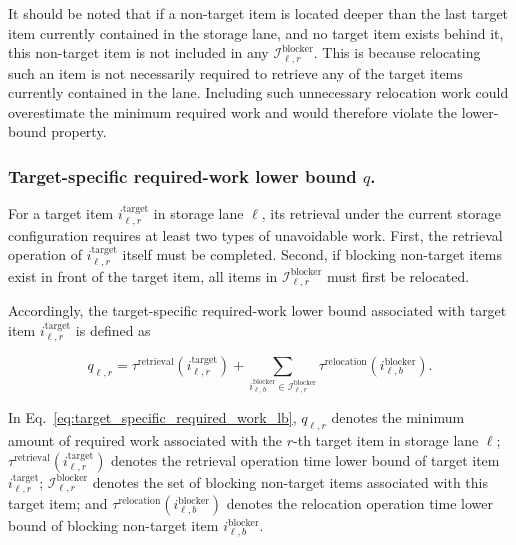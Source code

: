 It should be noted that if a non-target item is located deeper than the last
target item currently contained in the storage lane, and no target item exists
behind it, this non-target item is not included in any
\(\mathcal{I}^{\mathrm{blocker}}_{\ell,r}\). This is because relocating such an
item is not necessarily required to retrieve any of the target items currently
contained in the lane. Including such unnecessary relocation work could
overestimate the minimum required work and would therefore violate the
lower-bound property.

\subsubsection{Target-specific required-work lower bound \(q\).}

For a target item \(i^{\mathrm{target}}_{\ell,r}\) in storage lane \(\ell\),
its retrieval under the current storage configuration requires at least two
types of unavoidable work. First, the retrieval operation of
\(i^{\mathrm{target}}_{\ell,r}\) itself must be completed. Second, if blocking
non-target items exist in front of the target item, all items in
\(\mathcal{I}^{\mathrm{blocker}}_{\ell,r}\) must first be relocated.

Accordingly, the target-specific required-work lower bound associated with
target item \(i^{\mathrm{target}}_{\ell,r}\) is defined as

\begin{equation}
q_{\ell,r}
=
\tau^{\mathrm{retrieval}}
\left(
i^{\mathrm{target}}_{\ell,r}
\right)
+
\sum_{
i^{\mathrm{blocker}}_{\ell,b}
\in
\mathcal{I}^{\mathrm{blocker}}_{\ell,r}
}
\tau^{\mathrm{relocation}}
\left(
i^{\mathrm{blocker}}_{\ell,b}
\right).
\label{eq:target_specific_required_work_lb}
\end{equation}

In Eq.~\eqref{eq:target_specific_required_work_lb}, \(q_{\ell,r}\) denotes the
minimum amount of required work associated with the \(r\)-th target item in
storage lane \(\ell\);
\(\tau^{\mathrm{retrieval}}
(i^{\mathrm{target}}_{\ell,r})\) denotes the retrieval operation time lower
bound of target item \(i^{\mathrm{target}}_{\ell,r}\);
\(\mathcal{I}^{\mathrm{blocker}}_{\ell,r}\) denotes the set of blocking
non-target items associated with this target item; and
\(\tau^{\mathrm{relocation}}
(i^{\mathrm{blocker}}_{\ell,b})\) denotes the relocation operation time lower
bound of blocking non-target item \(i^{\mathrm{blocker}}_{\ell,b}\).

